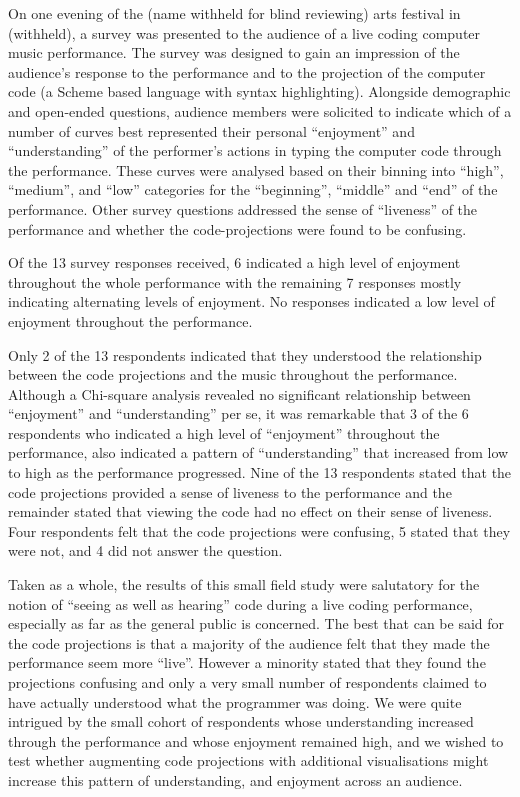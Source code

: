 \documentclass{sig-alternate}
\begin{document}
On one evening of the (name withheld for blind reviewing) arts
festival in (withheld), a survey was presented to the audience of a
live coding computer music performance. The survey was designed to
gain an impression of the audience's response to the performance and
to the projection of the computer code (a Scheme based language with
syntax highlighting). Alongside demographic and open-ended questions,
audience members were solicited to indicate which of a number of
curves best represented their personal ``enjoyment'' and
``understanding'' of the performer's actions in typing the computer
code through the performance. These curves were analysed based on
their binning into ``high'', ``medium'', and ``low'' categories for
the ``beginning'', ``middle'' and ``end'' of the performance. Other
survey questions addressed the sense of ``liveness'' of the
performance \cite{Auslander} and whether the code-projections were
found to be confusing.

Of the 13 survey responses received, 6 indicated a high level of
enjoyment throughout the whole performance with the remaining 7
responses mostly indicating alternating levels of enjoyment. No
responses indicated a low level of enjoyment throughout the
performance.

Only 2 of the 13 respondents indicated that they understood the
relationship between the code projections and the music throughout the
performance. Although a Chi-square analysis revealed no significant
relationship between ``enjoyment'' and ``understanding'' per se, it
was remarkable that 3 of the 6 respondents who indicated a high level
of ``enjoyment'' throughout the performance, also indicated a pattern
of ``understanding'' that increased from low to high as the
performance progressed. Nine of the 13 respondents stated that the
code projections provided a sense of liveness to the performance and
the remainder stated that viewing the code had no effect on their
sense of liveness. Four respondents felt that the code projections
were confusing, 5 stated that they were not, and 4 did not answer the
question.

Taken as a whole, the results of this small field study were
salutatory for the notion of ``seeing as well as hearing'' code during
a live coding performance, especially as far as the general public is
concerned. The best that can be said for the code projections is that
a majority of the audience felt that they made the performance seem
more ``live''. However a minority stated that they found the
projections confusing and only a very small number of respondents
claimed to have actually understood what the programmer was doing. We
were quite intrigued by the small cohort of respondents whose
understanding increased through the performance and whose enjoyment
remained high, and we wished to test whether augmenting code
projections with additional visualisations might increase this pattern
of understanding, and enjoyment across an audience.
\end{document}
